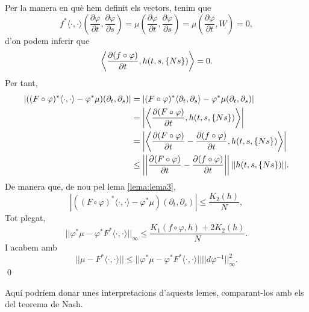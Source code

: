 {Per la manera en què hem definit els vectors, tenim que 
\begin{equation*}
    f^*\langle\cdot, \cdot\rangle\left(\frac{\partial\varphi}{\partial t},\frac{\partial\varphi}{\partial s}\right) = \mu\left(\frac{\partial\varphi}{\partial t},\frac{\partial\varphi}{\partial s}\right) = \mu\left(\frac{\partial\varphi}{\partial t},W\right) = 0,
\end{equation*}
d'on podem inferir que 
\begin{equation*}
    \left\langle \frac{\partial(f\circ\varphi)}{\partial t}, h(t,s,\{Ns\})\right\rangle = 0.
\end{equation*}
Per tant,
\begin{align*}
    |((F\circ\varphi)^*\langle\cdot,\cdot\rangle-\varphi^*\mu)(\partial_t,\partial_s)| &= |(F\circ\varphi)^*\langle\partial_t,\partial_s\rangle - \varphi^*\mu(\partial_t,\partial_s)|
    \\
    &= \left|\left\langle \frac{\partial(F\circ\varphi)}{\partial t}, h(t,s,\{Ns\}) \right\rangle\right|
    \\
    &= \left|\left\langle \frac{\partial(F\circ\varphi)}{\partial t}-\frac{\partial(f\circ\varphi)}{\partial t}, h(t,s,\{Ns\}) \right\rangle\right|
    \\
    &\le \left|\left| \frac{\partial(F\circ\varphi)}{\partial t} -\frac{\partial(f\circ\varphi)}{\partial t}\right|\right|||h(t,s,\{Ns\})||.
\end{align*}
De manera que, de nou pel lema \ref{lema:lema3},
\begin{equation*}
    |((F\circ\varphi)^*\langle\cdot,\cdot\rangle-\varphi^*\mu)(\partial_t,\partial_s)| \le \frac{K_2(h)}{N},
\end{equation*}
Tot plegat, 
\begin{equation*}
    ||\varphi^*\mu - \varphi^*F^*\langle\cdot,\cdot\rangle||_\infty \le \frac{K_1(f\circ \varphi, h) + 2K_2(h)}{N}.
\end{equation*}
I acabem amb 
\begin{equation*}
    ||\mu-F^*\langle\cdot,\cdot\rangle|| \le ||\varphi^*\mu - \varphi^*F^*\langle\cdot,\cdot\rangle|| ||d\varphi^{-1}||^2_\infty.
\end{equation*}
\qed
}





{
\color{blue}
\begin{obs}
    Aquí podríem donar unes interpretacions d'aquests lemes, comparant-los amb els del teorema de Nash.
\end{obs}
}
    
